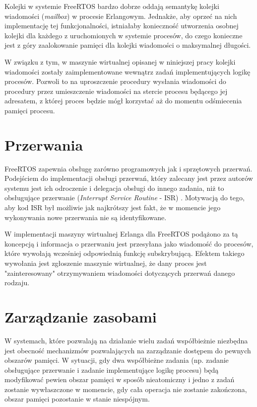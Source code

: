 Kolejki w systemie FreeRTOS bardzo dobrze oddają semantykę kolejki wiadomości (\emph{mailbox}) w procesie Erlangowym. Jednakże, aby oprzeć na nich implementację tej funkcjonalności, istniałaby konieczność utworzenia osobnej kolejki dla każdego z uruchomionych w systemie procesów, do czego konieczne jest z góry zaalokowanie pamięci dla kolejki wiadomości o maksymalnej długości.

W związku z tym, w maszynie wirtualnej opisanej w niniejszej pracy kolejki wiadomości zostały zaimplementowane wewnątrz zadań implementujących logikę procesów. Pozwoli to na uproszczenie procedury wysłania wiadomości do procedury przez umieszczenie wiadomości na stercie procesu będącego jej adresatem, z której proces będzie mógł korzystać aż do momentu odśmiecenia pamięci procesu. 

\section{Przerwania}
\label{sec:rtosPrzerwania}

FreeRTOS zapewnia obsługę zarówno programowych jak i sprzętowych przerwań. Podejściem do implementacji obsługi przerwań, który zalecany jest przez autorów systemu jest ich odroczenie i delegacja obsługi do innego zadania, niż to obsługujące przerwanie (\emph{Interrupt Service Routine} - ISR) \cite{Barry2011}. Motywacją do tego, aby kod ISR był możliwie jak najkrótszy jest fakt, że w momencie jego wykonywania nowe przerwania nie są identyfikowane.

W implementacji maszyny wirtualnej Erlanga dla FreeRTOS podążono za tą koncepcją i informacja o przerwaniu jest przesyłana jako wiadomość do procesów, które wywołają wcześniej odpowiednią funkcję subskrybującą. Efektem takiego wywołania jest zgłoszenie maszynie wirtualnej, że dany proces jest "zainteresowany" otrzymywaniem wiadomości dotyczących przerwań danego rodzaju. 

\section{Zarządzanie zasobami}
\label{sec:rtosZasoby}

W systemach, które pozwalają na działanie wielu zadań współbieżnie niezbędna jest obecność mechanizmów pozwalających na 
zarządzanie dostępem do pewnych obszarów pamięci. W sytuacji, gdy dwa współbieżne zadania (np. zadanie obsługujące przerwanie i 
zadanie implementujące logikę procesu) będą modyfikować pewien obszar pamięci w sposób nieatomiczny i jedno z zadań zostanie wywłaszczone w momencie, gdy cała operacja nie zostanie zakończona, obszar pamięci pozostanie w stanie niespójnym.

